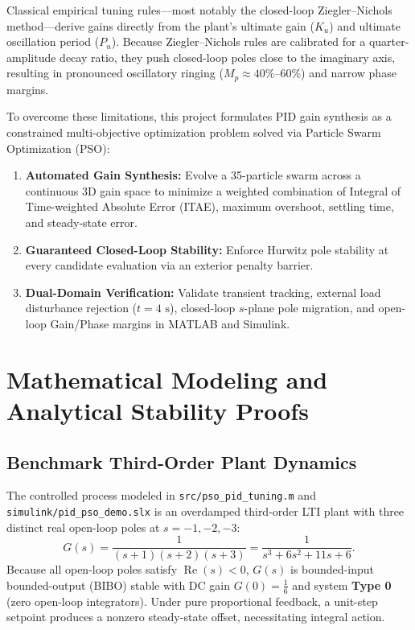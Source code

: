 \documentclass[11pt,a4paper]{article}
\begin{document}
Classical empirical tuning rules—most notably the closed-loop Ziegler--Nichols method—derive gains directly from the plant's ultimate gain ($K_u$) and ultimate oscillation period ($P_u$). Because Ziegler--Nichols rules are calibrated for a quarter-amplitude decay ratio, they push closed-loop poles close to the imaginary axis, resulting in pronounced oscillatory ringing ($M_p \approx 40\%\text{--}60\%$) and narrow phase margins.

To overcome these limitations, this project formulates PID gain synthesis as a constrained multi-objective optimization problem solved via Particle Swarm Optimization (PSO):
\begin{enumerate}[leftmargin=2em]
  \item \textbf{Automated Gain Synthesis:} Evolve a 35-particle swarm across a continuous 3D gain space to minimize a weighted combination of Integral of Time-weighted Absolute Error (ITAE), maximum overshoot, settling time, and steady-state error.
  \item \textbf{Guaranteed Closed-Loop Stability:} Enforce Hurwitz pole stability at every candidate evaluation via an exterior penalty barrier.
  \item \textbf{Dual-Domain Verification:} Validate transient tracking, external load disturbance rejection ($t = 4\text{ s}$), closed-loop $s$-plane pole migration, and open-loop Gain/Phase margins in MATLAB and Simulink.
\end{enumerate}

\section{Mathematical Modeling and Analytical Stability Proofs}

\subsection{Benchmark Third-Order Plant Dynamics}
The controlled process modeled in \texttt{src/pso\_pid\_tuning.m} and \texttt{simulink/pid\_pso\_demo.slx} is an overdamped third-order LTI plant with three distinct real open-loop poles at $s = -1, -2, -3$:
\begin{equation}
  G(s) = \frac{1}{(s+1)(s+2)(s+3)} = \frac{1}{s^3 + 6s^2 + 11s + 6}.
  \label{eq:plant}
\end{equation}
Because all open-loop poles satisfy $\operatorname{Re}(s) < 0$, $G(s)$ is bounded-input bounded-output (BIBO) stable with DC gain $G(0) = \frac{1}{6}$ and system \textbf{Type 0} (zero open-loop integrators). Under pure proportional feedback, a unit-step setpoint produces a nonzero steady-state offset, necessitating integral action.
\end{document}
